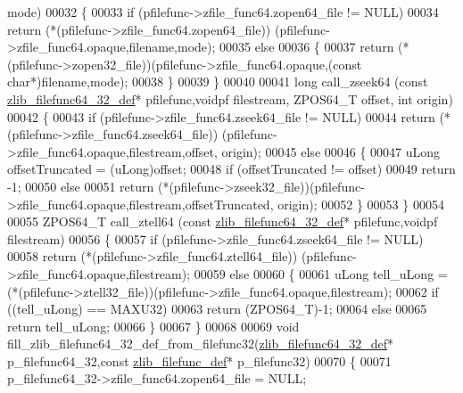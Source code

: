 \begin{DoxyCode}
      mode)
00032 \{
00033     \textcolor{keywordflow}{if} (pfilefunc->zfile\_func64.zopen64\_file != NULL)
00034         \textcolor{keywordflow}{return} (*(pfilefunc->zfile\_func64.zopen64\_file)) (pfilefunc->zfile\_func64.opaque,filename,mode);
00035     \textcolor{keywordflow}{else}
00036     \{
00037         \textcolor{keywordflow}{return} (*(pfilefunc->zopen32\_file))(pfilefunc->zfile\_func64.opaque,(\textcolor{keyword}{const} \textcolor{keywordtype}{char}*)filename,mode);
00038     \}
00039 \}
00040 
00041 \textcolor{keywordtype}{long} call\_zseek64 (\textcolor{keyword}{const} \hyperlink{structzlib__filefunc64__32__def__s}{zlib\_filefunc64\_32\_def}* pfilefunc,voidpf filestream, 
      ZPOS64\_T offset, \textcolor{keywordtype}{int} origin)
00042 \{
00043     \textcolor{keywordflow}{if} (pfilefunc->zfile\_func64.zseek64\_file != NULL)
00044         \textcolor{keywordflow}{return} (*(pfilefunc->zfile\_func64.zseek64\_file)) (pfilefunc->zfile\_func64.opaque,filestream,offset,
      origin);
00045     \textcolor{keywordflow}{else}
00046     \{
00047         uLong offsetTruncated = (uLong)offset;
00048         \textcolor{keywordflow}{if} (offsetTruncated != offset)
00049             \textcolor{keywordflow}{return} -1;
00050         \textcolor{keywordflow}{else}
00051             \textcolor{keywordflow}{return} (*(pfilefunc->zseek32\_file))(pfilefunc->zfile\_func64.opaque,filestream,offsetTruncated,
      origin);
00052     \}
00053 \}
00054 
00055 ZPOS64\_T call\_ztell64 (\textcolor{keyword}{const} \hyperlink{structzlib__filefunc64__32__def__s}{zlib\_filefunc64\_32\_def}* pfilefunc,voidpf filestream)
00056 \{
00057     \textcolor{keywordflow}{if} (pfilefunc->zfile\_func64.zseek64\_file != NULL)
00058         \textcolor{keywordflow}{return} (*(pfilefunc->zfile\_func64.ztell64\_file)) (pfilefunc->zfile\_func64.opaque,filestream);
00059     \textcolor{keywordflow}{else}
00060     \{
00061         uLong tell\_uLong = (*(pfilefunc->ztell32\_file))(pfilefunc->zfile\_func64.opaque,filestream);
00062         \textcolor{keywordflow}{if} ((tell\_uLong) == MAXU32)
00063             \textcolor{keywordflow}{return} (ZPOS64\_T)-1;
00064         \textcolor{keywordflow}{else}
00065             \textcolor{keywordflow}{return} tell\_uLong;
00066     \}
00067 \}
00068 
00069 \textcolor{keywordtype}{void} fill\_zlib\_filefunc64\_32\_def\_from\_filefunc32(\hyperlink{structzlib__filefunc64__32__def__s}{zlib\_filefunc64\_32\_def}* 
      p\_filefunc64\_32,\textcolor{keyword}{const} \hyperlink{structzlib__filefunc__def__s}{zlib\_filefunc\_def}* p\_filefunc32)
00070 \{
00071     p\_filefunc64\_32->zfile\_func64.zopen64\_file = NULL;

\end{DoxyCode}
